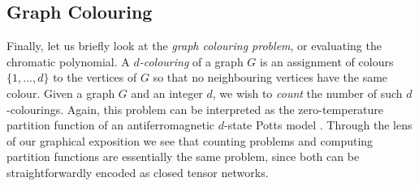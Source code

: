 \subsection{Graph Colouring}


Finally, let us briefly look at the \emph{graph colouring problem}, or evaluating the chromatic polynomial. A \emph{$d$-colouring} of a graph $G$ is an assignment of colours $\{1, ..., d\}$ to the vertices of $G$ so that no neighbouring vertices have the same colour. Given a graph $G$ and an integer $d$, we wish to \emph{count} the number of such $d$-colourings. Again, this problem can be interpreted as the zero-temperature
partition function of an antiferromagnetic $d$-state Potts model \cite{ChromaticPotts}.
Through the lens of our graphical exposition we see that counting problems and computing partition functions are essentially the same problem, since both can be straightforwardly encoded as closed tensor networks.

